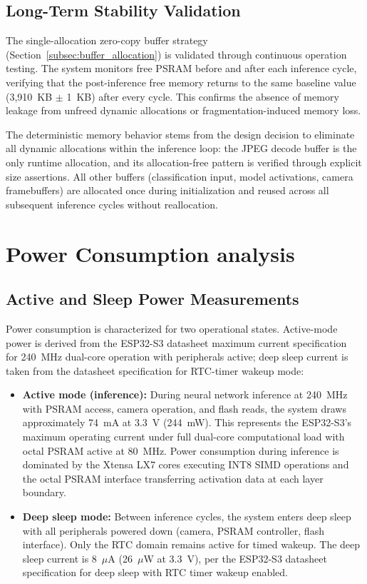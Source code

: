 \subsection*{Long-Term Stability Validation}
\label{subsec:long_term_stability}

The single-allocation zero-copy buffer strategy (Section~\ref{subsec:buffer_allocation}) is validated through continuous operation testing. The system monitors free PSRAM before and after each inference cycle, verifying that the post-inference free memory returns to the same baseline value (3,910~KB $\pm$ 1~KB) after every cycle. This confirms the absence of memory leakage from unfreed dynamic allocations or fragmentation-induced memory loss.

The deterministic memory behavior stems from the design decision to eliminate all dynamic allocations within the inference loop: the JPEG decode buffer is the only runtime allocation, and its allocation-free pattern is verified through explicit size assertions. All other buffers (classification input, model activations, camera framebuffers) are allocated once during initialization and reused across all subsequent inference cycles without reallocation.


\section{Power Consumption analysis}
\label{sec:power_consumption}

\subsection{Active and Sleep Power Measurements}
\label{subsec:power_measurements}

Power consumption is characterized for two operational states. Active-mode power is derived from the ESP32-S3 datasheet maximum current specification~\cite{esp32s3_datasheet} for 240~MHz dual-core operation with peripherals active; deep sleep current is taken from the datasheet specification for RTC-timer wakeup mode:

\begin{itemize}
    \item \textbf{Active mode (inference):} During neural network inference at 240~MHz with PSRAM access, camera operation, and flash reads, the system draws approximately 74~mA at 3.3~V (244~mW). This represents the ESP32-S3's maximum operating current under full dual-core computational load with octal PSRAM active at 80~MHz. Power consumption during inference is dominated by the Xtensa LX7 cores executing INT8 SIMD operations and the octal PSRAM interface transferring activation data at each layer boundary.
    \item \textbf{Deep sleep mode:} Between inference cycles, the system enters deep sleep with all peripherals powered down (camera, PSRAM controller, flash interface). Only the RTC domain remains active for timed wakeup. The deep sleep current is 8~$\mu$A (26~$\mu$W at 3.3~V), per the ESP32-S3 datasheet specification for deep sleep with RTC timer wakeup enabled.
\end{itemize}

